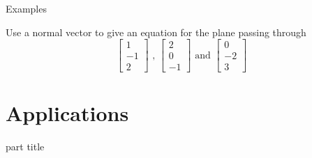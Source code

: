 \documentclass{beamer}
\begin{document}
\begin{frame}{Examples}
\begin{example}
  Use a normal vector to give an equation for the plane passing through
  \begin{equation*}
  \left[
  \begin{array}{c}
  1\\
  -1\\
  2
  \end{array}
  \right]\text{ , } \left[
  \begin{array}{c}
  2\\
  0\\
  -1
  \end{array}
  \right]\text{ and }
  \left[
  \begin{array}{c}
  0\\
  -2\\
  3
  \end{array}
  \right]
  \end{equation*}
\end{example}
\end{frame}

\section{Applications}

\begin{frame}
\begin{beamercolorbox}[sep=12pt,center]{part title}
\insertsection\par
\end{beamercolorbox}
\end{frame}
\end{document}
